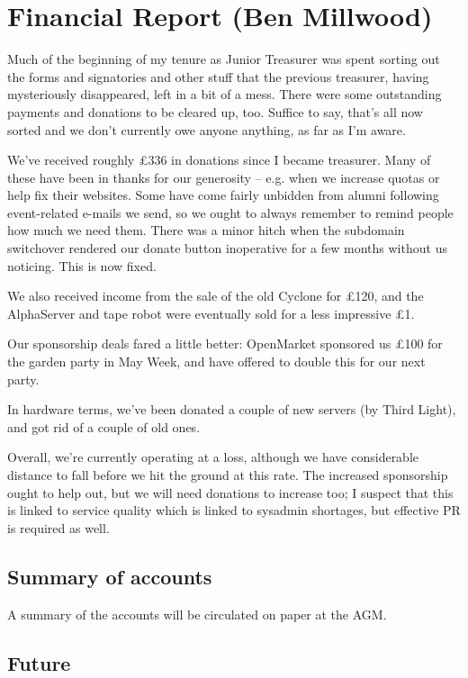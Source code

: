 \section{Financial Report (Ben Millwood)}

Much of the beginning of my tenure as Junior Treasurer was spent sorting
out the forms and signatories and other stuff that the previous
treasurer, having mysteriously disappeared, left in a bit of a mess.
There were some outstanding payments and donations to be cleared up,
too. Suffice to say, that's all now sorted and we don't currently owe
anyone anything, as far as I'm aware.

We've received roughly £336 in donations since I became treasurer. Many
of these have been in thanks for our generosity – e.g. when we increase
quotas or help fix their websites. Some have come fairly unbidden from
alumni following event-related e-mails we send, so we ought to always
remember to remind people how much we need them. There was a minor hitch
when the subdomain switchover rendered our donate button inoperative for
a few months without us noticing. This is now fixed.

We also received income from the sale of the old Cyclone for £120, and
the AlphaServer and tape robot were eventually sold for a less
impressive £1.

Our sponsorship deals fared a little better: OpenMarket sponsored us
£100 for the garden party in May Week, and have offered to double this
for our next party. 

In hardware terms, we've been donated a couple of new servers (by Third Light), and got
rid of a couple of old ones.

Overall, we're currently operating at a loss, although we have
considerable distance to fall before we hit the ground at this rate. The
increased sponsorship ought to help out, but we will need donations to
increase too; I suspect that this is linked to service quality which is
linked to sysadmin shortages, but effective PR is required as well.

\subsection{Summary of accounts}

A summary of the accounts will be circulated on paper at the AGM.

\subsection{Future}

